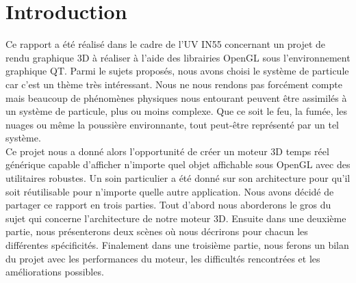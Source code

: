 \chapter*{Introduction}
 Ce rapport a été réalisé dans le cadre de l'UV IN55 concernant un projet de rendu graphique 3D à réaliser à l'aide des librairies OpenGL sous l'environnement graphique QT. Parmi le sujets proposés, nous avons choisi le système de particule car c'est un thème très intéressant. Nous ne nous rendons pas forcément compte mais beaucoup de phénomènes physiques nous entourant peuvent être assimilés à un système de particule, plus ou moins complexe. Que ce soit le feu, la fumée, les nuages ou même la poussière environnante, tout peut-être représenté par un tel système. \\
\indent Ce projet nous a donné alors l'opportunité de créer un moteur 3D temps réel générique capable d'afficher n'importe quel objet affichable sous OpenGL avec des utilitaires robustes. Un soin particulier a été donné sur son architecture pour qu'il soit réutilisable pour n'importe quelle autre application.
\indent Nous avons décidé de partager ce rapport en trois parties. Tout d'abord nous aborderons le gros du sujet qui concerne l'architecture de notre moteur 3D. Ensuite dans une deuxième partie, nous présenterons deux scènes où nous décrirons pour chacun les différentes spécificités. Finalement dans une troisième partie, nous ferons un bilan du projet avec les performances du moteur, les difficultés rencontrées et les améliorations possibles.
